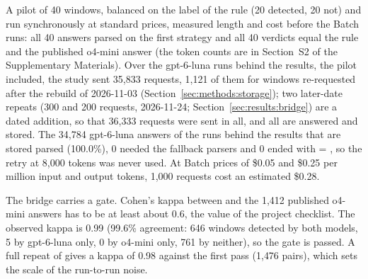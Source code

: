 A pilot of 40 windows, balanced on the label of the rule (20 detected, 20 not) and run synchronously at standard prices, measured length and cost before the Batch runs: all 40 answers parsed on the first strategy and all 40 verdicts equal the rule and the published o4-mini answer (the token counts are in Section~S2 of the Supplementary Materials). Over the gpt-6-luna runs behind the results, the pilot included, the study sent 35{,}833 requests, 1{,}121 of them for windows re-requested after the rebuild of 2026-11-03 (Section~\ref{sec:methods:storage}); two later-date repeats (300 and 200 requests, 2026-11-24; Section~\ref{sec:results:bridge}) are a dated addition, so that 36{,}333 requests were sent in all, and all are answered and stored. The 34{,}784 gpt-6-luna answers of the runs behind the results that are stored parsed (100.0\%), 0 needed the fallback parsers and 0 ended with  = , so the retry at 8{,}000 tokens was never used. At Batch prices of \$0.05 and \$0.25 per million input and output tokens, 1{,}000 requests cost an estimated \$0.28.

The bridge carries a gate. Cohen's kappa between  and the 1{,}412 published o4-mini answers has to be at least about 0.6, the value of the project checklist. The observed kappa is 0.99 (99.6\% agreement: 646 windows detected by both models, 5 by gpt-6-luna only, 0 by o4-mini only, 761 by neither), so the gate is passed. A full repeat of  gives a kappa of 0.98 against the first pass (1{,}476 pairs), which sets the scale of the run-to-run noise.

